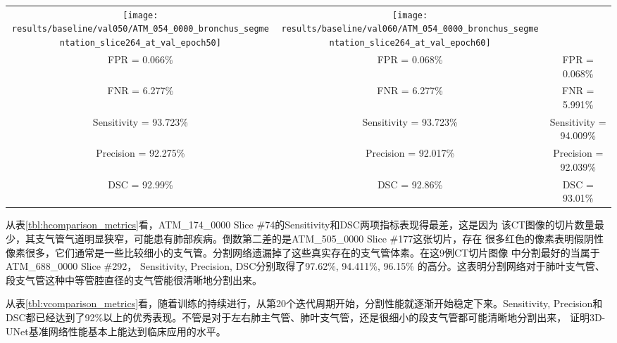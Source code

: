 \begin{enumerate}
\begin{table}[ht]
\begin{tabular}{|c|c|c|}
            \texttt{[image: results/baseline/val050/ATM\_054\_0000\_bronchus\_segmentation\_slice264\_at\_val\_epoch50]} & 
            \texttt{[image: results/baseline/val060/ATM\_054\_0000\_bronchus\_segmentation\_slice264\_at\_val\_epoch60]} \\
            FPR = 0.066\%          & FPR = 0.068\%             & FPR = 0.068\% \\
            FNR = 6.277\%          & FNR = 6.277\%             & FNR = 5.991\% \\
            Sensitivity = 93.723\% & Sensitivity = 93.723\%    & Sensitivity = 94.009\% \\
            Precision = 92.275\%   & Precision = 92.017\%      & Precision = 92.039\% \\
            DSC = 92.99\%          & DSC = 92.86\%             & DSC = 93.01\% \\
            \hline
        \end{tabular}
    \end{table}

\end{enumerate}

从表\ref{tbl:hcomparison_metrics}看，ATM\_174\_0000 Slice \#74的Sensitivity和DSC两项指标表现得最差，这是因为
该CT图像的切片数量最少，其支气管气道明显狭窄，可能患有肺部疾病。倒数第二差的是ATM\_505\_0000 Slice \#177这张切片，存在
很多红色的像素表明假阴性像素很多，它们通常是一些比较细小的支气管。分割网络遗漏掉了这些真实存在的支气管体素。在这9例CT切片图像
中分割最好的当属于ATM\_688\_0000 Slice \#292， Sensitivity, Precision, DSC分别取得了97.62\%, 94.411\%, 96.15\%
的高分。这表明分割网络对于肺叶支气管、段支气管这种中等管腔直径的支气管能很清晰地分割出来。

从表\ref{tbl:vcomparison_metrics}看，随着训练的持续进行，从第20个迭代周期开始，分割性能就逐渐开始稳定下来。Sensitivity,
Precision和DSC都已经达到了92\%以上的优秀表现。不管是对于左右肺主气管、肺叶支气管，还是很细小的段支气管都可能清晰地分割出来，
证明3D-UNet基准网络性能基本上能达到临床应用的水平。

